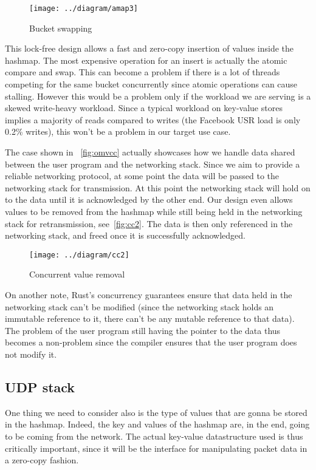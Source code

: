 \documentclass[11pt]{article}
\begin{document}
\begin{figure}
  \texttt{[image: ../diagram/amap3]}
  \caption{Bucket swapping}
  \label{fig:omvcc-swap}
\end{figure}

This lock-free design allows a fast and zero-copy insertion of values
inside the hashmap. The most expensive operation for an insert is
actually the atomic compare and swap. This can become a problem if
there is a lot of threads competing for the same bucket concurrently
since atomic operations can cause stalling. However this would be a
problem only if the workload we are serving is a skewed write-heavy
workload. Since a typical workload on key-value stores implies a
majority of reads compared to writes (the Facebook USR load is only
0.2\% writes), this won't be a problem in our target use case.

The case shown in ~\ref{fig:omvcc} actually showcases how we handle
data shared between the user program and the networking stack. Since
we aim to provide a reliable networking protocol, at some point the
data will be passed to the networking stack for transmission. At this
point the networking stack will hold on to the data until it is
acknowledged by the other end. Our design even allows values to be
removed from the hashmap while still being held in the networking
stack for retransmission, see~\ref{fig:cc2}. The data is then only
referenced in the networking stack, and freed once it is successfully
acknowledged.

\begin{figure}[h!]
  \texttt{[image: ../diagram/cc2]}
  \caption{Concurrent value removal}
\end{figure}

On another note, Rust's concurrency guarantees ensure that data held
in the networking stack can't be modified (since the networking stack
holds an immutable reference to it, there can't be any mutable
reference to that data). The problem of the user program still having
the pointer to the data thus becomes a non-problem since the compiler
ensures that the user program does not modify it.

\subsection{UDP stack}

One thing we need to consider also is the type of values that are
gonna be stored in the hashmap. Indeed, the key and values of the
hashmap are, in the end, going to be coming from the network. The
actual key-value datastructure used is thus critically important,
since it will be the interface for manipulating packet data in a
zero-copy fashion.
\end{document}
